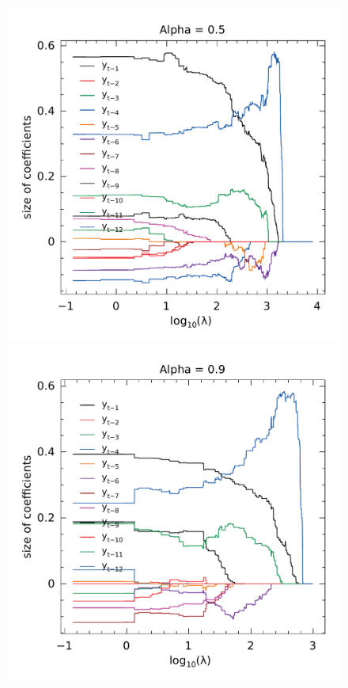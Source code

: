 \begin{figure}
\begin{minipage}[t]{0.4\linewidth}
\begin{minipage}[b]{\linewidth}
		\end{minipage}
		\begin{minipage}[b]{\linewidth}
			\centering     \includegraphics[width=\textwidth]{Figuras/selecao-lasso/par-sellasso-05.pdf}
		\end{minipage}
	\end{minipage}
	\begin{minipage}[t]{0.4\linewidth}
		\centering
		\begin{minipage}[b]{\linewidth}
			\centering     \includegraphics[width=\textwidth]{Figuras/selecao-lasso/par-sellasso-09.pdf}

\end{minipage}
\end{minipage}
\end{figure}
